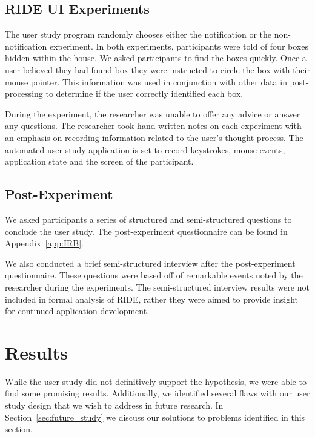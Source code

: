 \subsection{RIDE UI Experiments} %
\label{sub:ride_ui_experiments}
The user study program randomly chooses either the notification or the non-notification experiment. In both experiments, participants were told of four boxes hidden within the house. We asked participants to find the boxes quickly. Once a user believed they had found box they were instructed to circle the box with their mouse pointer. This information was used in conjunction with other data in post-processing to determine if the user correctly identified each box.

During the experiment, the researcher was unable to offer any advice or answer any questions. The researcher took hand-written notes on each experiment with an emphasis on recording information related to the user's thought process. The automated user study application is set to record keystrokes, mouse events, application state and the screen of the participant.


\subsection{Post-Experiment} %
\label{sub:post_experiment}
We asked participants a series of structured and semi-structured questions to conclude the user study. The post-experiment questionnaire can be found in Appendix~\ref{app:IRB}.

We also conducted a brief semi-structured interview after the post-experiment questionnaire. These questions were based off of remarkable events noted by the researcher during the experiments. The semi-structured interview results were not included in formal analysis of RIDE, rather they were aimed to provide insight for continued application development.

\section{Results}
\label{sec:study-results}
While the user study did not definitively support the hypothesis, we were able to find some promising results. Additionally, we identified several flaws with our user study design that we wish to address in future research. In Section~\ref{sec:future_study} we discuss our solutions to problems identified in this section.

